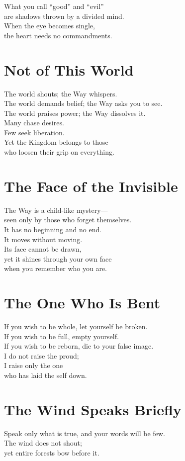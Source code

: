 \documentclass[10pt, openright]{book}
\begin{document}
What you call ``good'' and ``evil'' \\
are shadows thrown by a divided mind. \\
When the eye becomes single, \\
the heart needs no commandments.

\section{Not of This World}
The world shouts; the Way whispers. \\
The world demands belief; the Way asks you to see. \\
The world praises power; the Way dissolves it. \\

Many chase desires. \\
Few seek liberation. \\
Yet the Kingdom belongs to those \\
who loosen their grip on everything.

\section{The Face of the Invisible}
The Way is a child-like mystery— \\
seen only by those who forget themselves. \\

It has no beginning and no end. \\
It moves without moving. \\
Its face cannot be drawn, \\
yet it shines through your own face \\
when you remember who you are.

\section{The One Who Is Bent}
If you wish to be whole, let yourself be broken. \\
If you wish to be full, empty yourself. \\
If you wish to be reborn, die to your false image. \\

I do not raise the proud; \\
I raise only the one \\
who has laid the self down.

\section{The Wind Speaks Briefly}
Speak only what is true, and your words will be few. \\
The wind does not shout; \\
yet entire forests bow before it. \\
\end{document}
